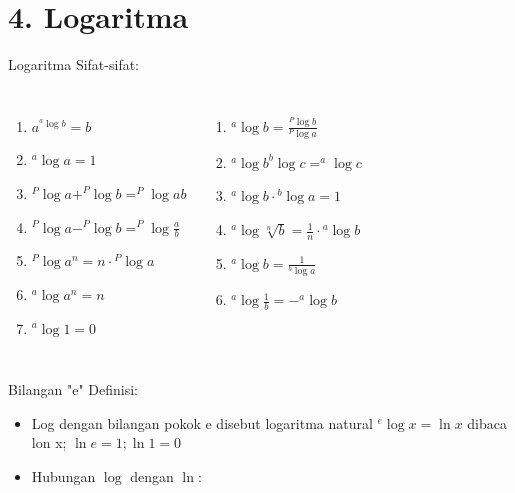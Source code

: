 \documentclass{beamer}
\newcounter{saveenumi}
\newcommand{\seti}{\setcounter{saveenumi}{\value{enumi}}}
\newcommand{\conti}{\setcounter{enumi}{\value{saveenumi}}}
\begin{document}
\section{4. Logaritma}
\begin{frame}[t,fragile]{Logaritma}
\vskip12pt
Sifat-sifat:
\begin{columns}
\begin{enumerate}
    \item $a^{^{a}\log{b}}=b$
    \item $^{a}\log{a}=1$
    \item $^{P}\log{a}+^{P}\log{b}=^{P}\log{ab}$
    \item $^{P}\log{a}-^{P}\log{b}=^{P}\log{\frac{a}{b}}$
    \item $^{P}\log{a^n} = n \cdot {^{P}\log{a}}$
    \item $^{a}\log{a^n} = n$
    \item $^{a}\log{1} = 0$
    \seti
\end{enumerate}
\begin{enumerate}
    \conti
    \item ${^{a}\log{b}}=\frac{^{P}\log{b}}{^{P}\log{a}}$
    \item $^{a}\log{b}^{b}\log{c}=^{a}\log{c}$
    \item $^{a}\log{b} \cdot {^{b}\log{a}}=1$
    \item $^{a}\log{\sqrt[n]{b}}=\frac{1}{n} \cdot {^{a}\log{b}}$
    \item $^{a}\log{b} = \frac{1} {^{b}\log{a}}$
    \item $^{a}\log{\frac{1}{b}} = - ^{a}\log{b}$

\end{enumerate}
\end{columns}
\end{frame}

\begin{frame}[t,fragile]{Bilangan "e"}
Definisi:

\begin{center}
\end{center}
\begin{itemize}
\item Log dengan bilangan pokok e disebut logaritma natural
$^{e}\log x = \ln x$ dibaca lon x; $\ln e=1; \ln 1 = 0$
\item Hubungan $\log$ dengan $\ln$:
\vskip12pt
\end{itemize}
\end{frame}
\end{document}
